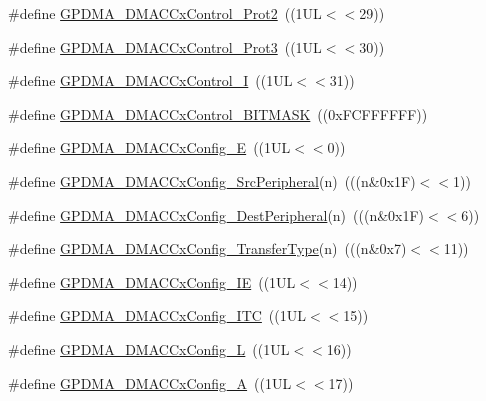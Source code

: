\begin{DoxyCompactItemize}
\item 
\#define \hyperlink{group___g_p_d_m_a___private___macros_gabe38faff26ee3951122c23ff1425d70a}{\-G\-P\-D\-M\-A\-\_\-\-D\-M\-A\-C\-Cx\-Control\-\_\-\-Prot2}~((1\-U\-L$<$$<$29))
\item 
\#define \hyperlink{group___g_p_d_m_a___private___macros_gaf6a439bbf5a4b082fa7f36effca23f15}{\-G\-P\-D\-M\-A\-\_\-\-D\-M\-A\-C\-Cx\-Control\-\_\-\-Prot3}~((1\-U\-L$<$$<$30))
\item 
\#define \hyperlink{group___g_p_d_m_a___private___macros_ga6ef0b54b0190c139796679d6db1e6e19}{\-G\-P\-D\-M\-A\-\_\-\-D\-M\-A\-C\-Cx\-Control\-\_\-\-I}~((1\-U\-L$<$$<$31))
\item 
\#define \hyperlink{group___g_p_d_m_a___private___macros_ga310d67f1cf22faf3add04b96fb3bfd2a}{\-G\-P\-D\-M\-A\-\_\-\-D\-M\-A\-C\-Cx\-Control\-\_\-\-B\-I\-T\-M\-A\-S\-K}~((0x\-F\-C\-F\-F\-F\-F\-F\-F))
\item 
\#define \hyperlink{group___g_p_d_m_a___private___macros_ga1c7608bb37d512277e42672ee4e785a5}{\-G\-P\-D\-M\-A\-\_\-\-D\-M\-A\-C\-Cx\-Config\-\_\-\-E}~((1\-U\-L$<$$<$0))
\item 
\#define \hyperlink{group___g_p_d_m_a___private___macros_gaccb73c66c5349ec79a3f332d77554f0c}{\-G\-P\-D\-M\-A\-\_\-\-D\-M\-A\-C\-Cx\-Config\-\_\-\-Src\-Peripheral}(n)~(((n\&0x1\-F)$<$$<$1))
\item 
\#define \hyperlink{group___g_p_d_m_a___private___macros_ga3b65fa1394d8c93789dd249c4e8a7568}{\-G\-P\-D\-M\-A\-\_\-\-D\-M\-A\-C\-Cx\-Config\-\_\-\-Dest\-Peripheral}(n)~(((n\&0x1\-F)$<$$<$6))
\item 
\#define \hyperlink{group___g_p_d_m_a___private___macros_ga63bace54233ed2446a1b442b46243833}{\-G\-P\-D\-M\-A\-\_\-\-D\-M\-A\-C\-Cx\-Config\-\_\-\-Transfer\-Type}(n)~(((n\&0x7)$<$$<$11))
\item 
\#define \hyperlink{group___g_p_d_m_a___private___macros_ga0fb4c3e9768c0a757b6ff25f77b75a26}{\-G\-P\-D\-M\-A\-\_\-\-D\-M\-A\-C\-Cx\-Config\-\_\-\-I\-E}~((1\-U\-L$<$$<$14))
\item 
\#define \hyperlink{group___g_p_d_m_a___private___macros_gac7c379cbf11a214f436620e4f7a7ee2a}{\-G\-P\-D\-M\-A\-\_\-\-D\-M\-A\-C\-Cx\-Config\-\_\-\-I\-T\-C}~((1\-U\-L$<$$<$15))
\item 
\#define \hyperlink{group___g_p_d_m_a___private___macros_ga37a55c8ebde3d56defbf6281534237fe}{\-G\-P\-D\-M\-A\-\_\-\-D\-M\-A\-C\-Cx\-Config\-\_\-\-L}~((1\-U\-L$<$$<$16))
\item 
\#define \hyperlink{group___g_p_d_m_a___private___macros_gae28eb1e74ecafc5e6170e3f7a8688335}{\-G\-P\-D\-M\-A\-\_\-\-D\-M\-A\-C\-Cx\-Config\-\_\-\-A}~((1\-U\-L$<$$<$17))
$$
\end{DoxyCompactItemize}
